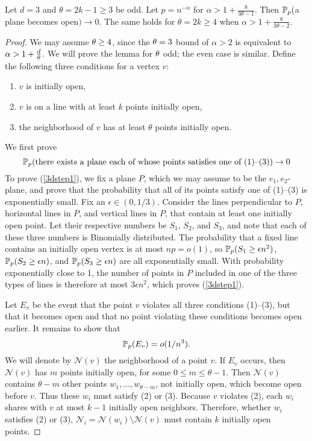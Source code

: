 \begin{lemma}\label{d3upperbound}
Let $d=3$ and $\theta=2k-1 \ge 3$ be odd. Let $p = n^{-\alpha}$ for $\alpha > 1 + \frac{8}{3\theta-1}$. Then $\mathbb{P}_p($a plane becomes open$)\to 0$. 
The same holds for $\theta=2k \ge 4$ when $\alpha > 1 + \frac{8}{3\theta-2}$.
\end{lemma}
\begin{proof}
We may assume $\theta \geq 4$, since the $\theta = 3$ bound of $\alpha > 2$ is equivalent to $\alpha>1 + \frac{d}{\theta}$.  We will prove the lemma for $\theta$ odd; the even case is similar.  Define the following three conditions for a vertex $v$:
\begin{enumerate}
\item $v$ is initially open,
\item $v$ is on a line with at least $k$ points initially open,
\item the neighborhood of $v$ has at least $\theta$ points initially open.
\end{enumerate}

We first prove 
\begin{equation}
\label{3dstep1}
\mathbb{P}_p(\text{there exists a plane each of whose points satisfies one of (1)--(3)})\to 0
\end{equation}
To prove (\ref{3dstep1}), we fix a plane $P$, which we may assume to be the $e_1,e_2$-plane, 
and prove that the probability that 
all of its points satisfy one of (1)--(3)
is exponentially small. Fix an $\epsilon\in(0,1/3)$. 
Consider the lines perpendicular to $P$, horizontal lines
in $P$, and vertical lines in $P$, that contain at least one initially open point. 
Let their respective numbers be $S_1$, $S_2$, and $S_3$, and note that each of these
three numbers is Binomially distributed.  The probability that a fixed line 
contains an initially open vertex is at most $np=o(1)$, so $\mathbb{P}_p(S_1\ge \epsilon n^2)$,
 $\mathbb{P}_p(S_2\ge \epsilon n)$, and
 $\mathbb{P}_p(S_3\ge \epsilon n)$ are all exponentially small. With probability exponentially 
close to 1, the number of points in $P$ included in one of the three types of lines is therefore 
at most $3\epsilon n^2$, which proves (\ref{3dstep1}).

Let $E_v$ be the event that the point $v$ violates all three conditions (1)--(3), 
but that it becomes open and that no point violating these conditions becomes 
open earlier.  It remains to show that 
\begin{equation}
\label{3dstep2}
\mathbb{P}_p(E_v)=o(1/n^3).
\end{equation}
We will denote by $\mathcal{N}(v)$ the neighborhood of a point $v$. 
If $E_v$ occurs, then $\mathcal{N}(v)$ has $m$ points initially open, for some 
$0 \le m \le \theta - 1$. Then $\mathcal{N}(v)$ contains $\theta-m$ other points 
$w_1, \ldots, w_{\theta-m}$, not initially open, which become open before $v$. 
Thus these $w_i$  must satisfy (2) or (3). 
Because $v$ violates (2), each $w_i$ shares with $v$ at most $k-1$ initially open neighbors. 
Therefore, whether $w_i$ satisfies (2) or (3),
 $\mathcal N_i=\mathcal{N}(w_i) \setminus\mathcal{N}(v)$ must contain
$k$ initially open points.


\end{proof}
